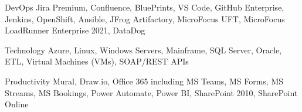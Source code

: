 

\begin{cvskills}

  \cvskill
    {DevOps} %
    {Jira Premium, Confluence, BluePrints, VS Code, GitHub Enterprise, Jenkins, OpenShift, Ansible, JFrog Artifactory, MicroFocus UFT, MicroFocus LoadRunner Enterprise 2021, DataDog } %

  \cvskill
    {Technology} %
    {Azure, Linux, Windows Servers, Mainframe, SQL Server, Oracle, ETL, Virtual Machines (VMs), SOAP/REST APIs} %

  \cvskill
    {Productivity} %
    {Mural, Draw.io, Office 365 including MS Teams, MS Forms, MS Streams, MS Bookings, Power Automate, Power BI, SharePoint 2010, SharePoint Online} %

\end{cvskills}
